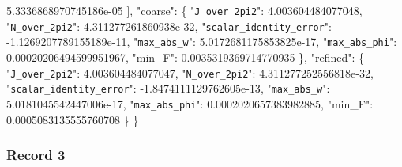 \documentclass[
  10pt,
]{article}
\newenvironment{Shaded}{}{}
\newcommand{\DataTypeTok}[1]{\textcolor[rgb]{0.56,0.13,0.00}{#1}}
\newcommand{\FloatTok}[1]{\textcolor[rgb]{0.25,0.63,0.44}{#1}}
\newcommand{\FunctionTok}[1]{\textcolor[rgb]{0.02,0.16,0.49}{#1}}
\newcommand{\OtherTok}[1]{\textcolor[rgb]{0.00,0.44,0.13}{#1}}
\begin{document}
\begin{Shaded}
\begin{Highlighting}[]
    \FloatTok{5.3336868970745186e{-}05}
  \OtherTok{]}\FunctionTok{,}
  \DataTypeTok{"coarse"}\FunctionTok{:} \FunctionTok{\{}
    \DataTypeTok{"\nolinkurl{J_over_2pi2}"}\FunctionTok{:} \FloatTok{4.003604484077048}\FunctionTok{,}
    \DataTypeTok{"\nolinkurl{N_over_2pi2}"}\FunctionTok{:} \FloatTok{4.311277261860938e{-}32}\FunctionTok{,}
    \DataTypeTok{"\nolinkurl{scalar_identity_error}"}\FunctionTok{:} \FloatTok{{-}1.1269207789155189e{-}11}\FunctionTok{,}
    \DataTypeTok{"\nolinkurl{max_abs_w}"}\FunctionTok{:} \FloatTok{5.0172681175853825e{-}17}\FunctionTok{,}
    \DataTypeTok{"\nolinkurl{max_abs_phi}"}\FunctionTok{:} \FloatTok{0.00020206494599951967}\FunctionTok{,}
    \DataTypeTok{"min\_F"}\FunctionTok{:} \FloatTok{0.0035319369714770935}
  \FunctionTok{\},}
  \DataTypeTok{"refined"}\FunctionTok{:} \FunctionTok{\{}
    \DataTypeTok{"\nolinkurl{J_over_2pi2}"}\FunctionTok{:} \FloatTok{4.003604484077047}\FunctionTok{,}
    \DataTypeTok{"\nolinkurl{N_over_2pi2}"}\FunctionTok{:} \FloatTok{4.311277252556818e{-}32}\FunctionTok{,}
    \DataTypeTok{"\nolinkurl{scalar_identity_error}"}\FunctionTok{:} \FloatTok{{-}1.8474111129762605e{-}13}\FunctionTok{,}
    \DataTypeTok{"\nolinkurl{max_abs_w}"}\FunctionTok{:} \FloatTok{5.0181045542447006e{-}17}\FunctionTok{,}
    \DataTypeTok{"\nolinkurl{max_abs_phi}"}\FunctionTok{:} \FloatTok{0.0002020657383982885}\FunctionTok{,}
    \DataTypeTok{"min\_F"}\FunctionTok{:} \FloatTok{0.0005083135555760708}
  \FunctionTok{\}}
\FunctionTok{\}}
\end{Highlighting}
\end{Shaded}

\hypertarget{record-3-2}{%
\subsubsection{Record 3}\label{record-3-2}}
\end{document}
